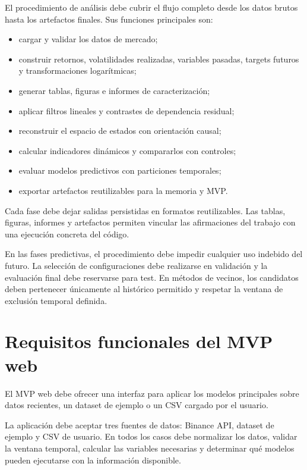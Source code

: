 El procedimiento de análisis debe cubrir el flujo completo desde los datos brutos hasta los artefactos finales. Sus funciones principales son:

\begin{itemize}
    \item cargar y validar los datos de mercado;
    \item construir retornos, volatilidades realizadas, variables pasadas, targets futuros y transformaciones logarítmicas;
    \item generar tablas, figuras e informes de caracterización;
    \item aplicar filtros lineales y contrastes de dependencia residual;
    \item reconstruir el espacio de estados con orientación causal;
    \item calcular indicadores dinámicos y compararlos con controles;
    \item evaluar modelos predictivos con particiones temporales;
    \item exportar artefactos reutilizables para la memoria y MVP.
\end{itemize}

Cada fase debe dejar salidas persistidas en formatos reutilizables. Las tablas, figuras, informes y artefactos permiten vincular las afirmaciones del trabajo con una ejecución concreta del código.

En las fases predictivas, el procedimiento debe impedir cualquier uso indebido del futuro. La selección de configuraciones debe realizarse en validación y la evaluación final debe reservarse para test. En métodos de vecinos, los candidatos deben pertenecer únicamente al histórico permitido y respetar la ventana de exclusión temporal definida.

\section{Requisitos funcionales del MVP web}\label{sec:requisitos-mvp}

El MVP web debe ofrecer una interfaz para aplicar los modelos principales sobre datos recientes, un dataset de ejemplo o un CSV cargado por el usuario.

La aplicación debe aceptar tres fuentes de datos: Binance API, dataset de ejemplo y CSV de usuario. En todos los casos debe normalizar los datos, validar la ventana temporal, calcular las variables necesarias y determinar qué modelos pueden ejecutarse con la información disponible.

